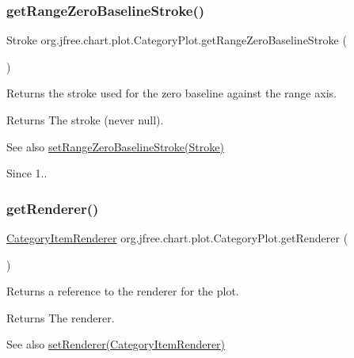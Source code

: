 \subsubsection{\texorpdfstring{get\+Range\+Zero\+Baseline\+Stroke()}{getRangeZeroBaselineStroke()}}
{\footnotesize\ttfamily Stroke org.\+jfree.\+chart.\+plot.\+Category\+Plot.\+get\+Range\+Zero\+Baseline\+Stroke (\begin{DoxyParamCaption}{ }\end{DoxyParamCaption})}

Returns the stroke used for the zero baseline against the range axis.

\begin{DoxyReturn}{Returns}
The stroke (never {\ttfamily null}).
\end{DoxyReturn}
\begin{DoxySeeAlso}{See also}
\mbox{\hyperlink{classorg_1_1jfree_1_1chart_1_1plot_1_1_category_plot_a9a31e7897f3b93d1bd8b77e2c35ca08b}{set\+Range\+Zero\+Baseline\+Stroke(\+Stroke)}}
\end{DoxySeeAlso}
\begin{DoxySince}{Since}
1.. 
\end{DoxySince}
\mbox{\label{classorg_1_1jfree_1_1chart_1_1plot_1_1_category_plot_aa00ab3d14f76887f00095323f2538d14}} 
\subsubsection{\texorpdfstring{get\+Renderer()}{getRenderer()}\hspace{0.1cm}{\footnotesize\ttfamily [1/2]}}
{\footnotesize\ttfamily \mbox{\hyperlink{interfaceorg_1_1jfree_1_1chart_1_1renderer_1_1category_1_1_category_item_renderer}{Category\+Item\+Renderer}} org.\+jfree.\+chart.\+plot.\+Category\+Plot.\+get\+Renderer (\begin{DoxyParamCaption}{ }\end{DoxyParamCaption})}

Returns a reference to the renderer for the plot.

\begin{DoxyReturn}{Returns}
The renderer.
\end{DoxyReturn}
\begin{DoxySeeAlso}{See also}
\mbox{\hyperlink{classorg_1_1jfree_1_1chart_1_1plot_1_1_category_plot_ac375aaa8e79ffb62fab2a94cdf5c2217}{set\+Renderer(\+Category\+Item\+Renderer)}} 
\end{DoxySeeAlso}
\mbox{\label{classorg_1_1jfree_1_1chart_1_1plot_1_1_category_plot_abf90ab29e7c3ddb968f7668e0f697725}} 
